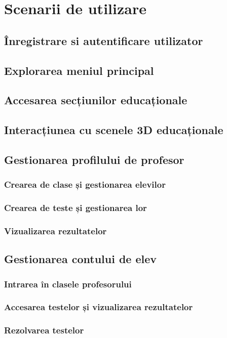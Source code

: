 \chapter{Scenarii de utilizare}
\label{chapter:implementare}

\section{Înregistrare si autentificare utilizator}
\label{sec:inregistrare-utilizator}

\section{Explorarea meniul principal}
\label{sec:explorare-meniu-principal}

\section{Accesarea secțiunilor educaționale}
\label{subsec:accesare-sectiuni-educationale}

\section{Interacțiunea cu scenele 3D educaționale}
\label{subsec:interactiune-scene-3d}

\section{Gestionarea profilului de profesor}
\label{sec:gestionare-profil-utilizator}

\subsection{Crearea de clase și gestionarea elevilor}
\label{subsec:creare-clase-elevi}

\subsection{Crearea de teste și gestionarea lor}
\label{subsec:creare-teste}

\subsection{Vizualizarea rezultatelor}
\label{subsec:vizualizare-rezultate}

\section{Gestionarea contului de elev}
\label{subsec:gestionare-cont-elev}

\subsection{Intrarea în clasele profesorului}
\label{subsec:intrare-clase-profesor}

\subsection{Accesarea testelor și vizualizarea rezultatelor}
\label{subsec:accesare-teste-elev}

\subsection{Rezolvarea testelor}
\label{subsec:rezolvare-teste}